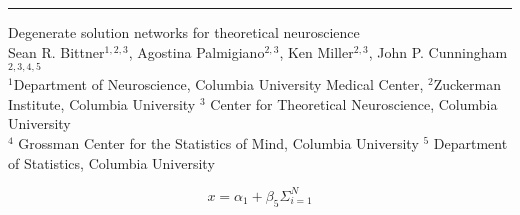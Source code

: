 \documentclass[landscape]{article}
\begin{document}
\color{black}

\hrule width 0pt depth 0pt height 1pt

\begin{center}
Degenerate solution networks for theoretical neuroscience \\
  Sean R. Bittner$^{1,2,3}$, Agostina Palmigiano$^{2,3}$, Ken Miller$^{2,3}$, John P. Cunningham$^{2,3,4,5}$ \\
  $^{1}$Department of Neuroscience, Columbia University Medical Center, $^{2}$Zuckerman Institute, Columbia University $^{3}$ Center for Theoretical Neuroscience, Columbia University \\ $^{4}$ Grossman Center for the Statistics of Mind, Columbia University $^{5}$ Department of Statistics, Columbia University
\end{center}

\vspace{.5in}

\setlength{\columnsep}{1in}
\begin{multicols*}{4}
\Huge
\[x = \alpha_1 + \beta_5 \Sigma_{i=1}^N \]


\end{multicols*}
\end{document}
